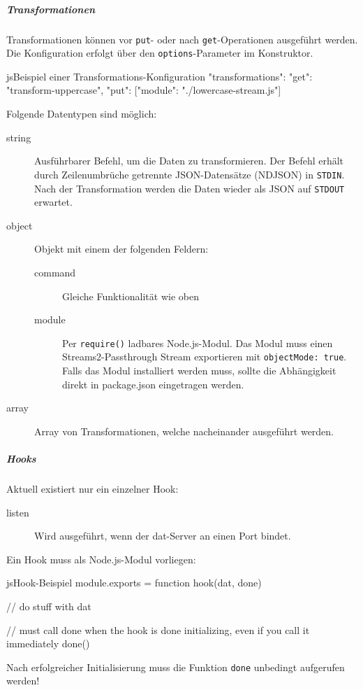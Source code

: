 \subparagraph{Transformationen}
Transformationen können vor \texttt{put}- oder nach \texttt{get}-Operationen ausgeführt werden. Die Konfiguration erfolgt über den \texttt{options}-Parameter im Konstruktor.

\begin{srclst}{js}{Beispiel einer Transformations-Konfiguration}
{
  "transformations": {
    "get": "transform-uppercase",
    "put": [{"module": "./lowercase-stream.js"}]
  }
}
\end{srclst}

Folgende Datentypen sind möglich:
\begin{description}
\item[string] Ausführbarer Befehl, um die Daten zu transformieren. Der Befehl erhält durch Zeilenumbrüche getrennte JSON-Datensätze (NDJSON) in \texttt{STDIN}. Nach der Transformation werden die Daten wieder als JSON auf \texttt{STDOUT} erwartet.
\item[object] Objekt mit einem der folgenden Feldern:
    \begin{description}
    \item[command] Gleiche Funktionalität wie oben
    \item[module] Per \texttt{require()} ladbares Node.js-Modul. Das Modul muss einen Streams2-Passthrough Stream exportieren mit \texttt{objectMode: true}. Falls das Modul installiert werden muss, sollte die Abhängigkeit direkt in package.json eingetragen werden.
    \end{description}
\item[array] Array von Transformationen, welche nacheinander ausgeführt werden.
\end{description}

\subparagraph{Hooks}
Aktuell existiert nur ein einzelner Hook:
\begin{description}
\item[listen] Wird ausgeführt, wenn der dat-Server an einen Port bindet.
\end{description}

Ein Hook muss als Node.js-Modul vorliegen:
\begin{srclst}{js}{Hook-Beispiel}
module.exports = function hook(dat, done) {
  // do stuff with dat

  // must call done when the hook is done initializing, even if you call it immediately
  done()
}
\end{srclst}

Nach erfolgreicher Initialisierung muss die Funktion \texttt{done} unbedingt aufgerufen werden!

